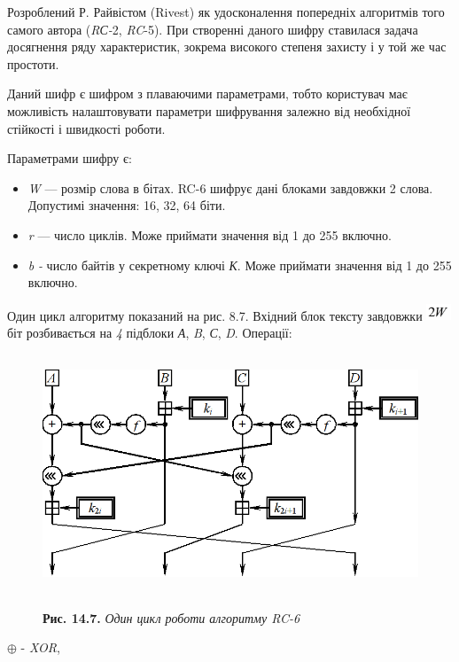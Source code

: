 \bigskip

Розроблений Р. Райвістом (Rivest) як удосконалення попередніх алгоритмів того
самого автора (\textit{R}\textit{С-}2, \textit{RC}{}-5). При створенні даного
шифру ставилася задача досягнення ряду характеристик, зокрема високого степеня
захисту і у той же час простоти.


\bigskip

Даний шифр є шифром з плаваючими параметрами, тобто користувач має можливість
налаштовувати параметри шифрування залежно від необхідної стійкості і швидкості
роботи.

Параметрами шифру є: 

\liststyleWWviiiNumxlii
\begin{itemize}
\item \textit{W }--- розмір слова в бітах. RC-6 шифрує дані блоками завдовжки 2
слова. Допустимі значення: 16, 32, 64 біти.
\item \textit{r }--- число циклів. Може приймати значення від 1 до 255 включно.
\item \textit{b}\textit{ }\textit{{}-}\textit{ }число байтів у секретному ключі
\textit{К}. Може приймати значення від 1 до 255 включно.
\end{itemize}
Один цикл алгоритму показаний на рис. 8.7. Вхідний блок тексту завдовжки 
\includegraphics[width=0.2917in,height=0.1937in]{crypt-img/crypt-img304.png} 
біт розбивається на \textit{4 }підблоки \textit{А}, \textit{B}, \textit{С},
\textit{D}. Операції:

\begin{figure}
\centering
\begin{minipage}{}
 \includegraphics[width=4.6146in,height=2.8071in]{crypt-img/crypt-img305.png} 
\end{minipage}
\end{figure}
\begin{figure}
\centering
\begin{minipage}{}
{\centering
\textbf{Рис. 14.7. }\textit{Один цикл роботи алгоритму RC-6}
\par}
\end{minipage}
\end{figure}
  ${{\oplus}}$  {}- \textit{XOR},

